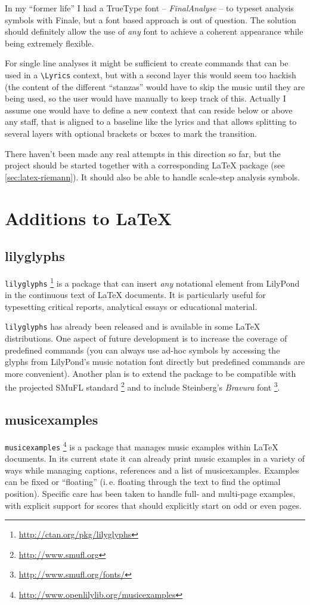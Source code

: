 \documentclass[oneside]{OLLbook}
\begin{document}
In my “former life” I had a TrueType font -- \emph{{FinalAnalyse}} -- to typeset analysis symbols with Finale, but a font based approach is out of question.
The solution should definitely allow the use of \emph{any} font to achieve a coherent appearance while being extremely flexible.

For single line analyses it might be sufficient to create commands that can be used in a \texttt{\textbackslash Lyrics} context, but with a second layer this would seem too hackish (the content of the different “stanzas” would have to skip the music until they are being used, so the user would have manually to keep track of this.
Actually I assume one would have to define a new context that can reside below or above any staff, that is aligned to a baseline like the lyrics and that allows splitting to several layers with optional brackets or boxes to mark the transition.

There haven't been made any real attempts in this direction so far, but the project should be started together with a corresponding \LaTeX{} package (see \ref{sec:latex-riemann}).
It should also be able to handle scale-step analysis symbols.

\chapter{Additions to \LaTeX}

\section{lilyglyphs}
\texttt{lilyglyphs}%
\footnote{\url{http://ctan.org/pkg/lilyglyphs}}
is a package that can insert \emph{any} notational element from LilyPond in the continuous text of \LaTeX{} documents.
It is particularly useful for typesetting critical reports, analytical essays or educational material.

\texttt{lilyglyphs} has already been released and is available in some \LaTeX{} distributions.
One aspect of future development is to increase the coverage of predefined commands (you can always use ad-hoc symbols by accessing the glyphs from LilyPond's music notation font directly but predefined commands are more convenient).
Another plan is to extend the package to be compatible with the projected SMuFL standard%
\footnote{\url{http://www.smufl.org}}
and to include Steinberg's \emph{Bravura} font%
\footnote{\url{http://www.smufl.org/fonts/}}.


\section{musicexamples}\label{sec:musicexamples}
\texttt{musicexamples}%
\footnote{\url{http://www.openlilylib.org/musicexamples}}
is a package that manages music examples within \LaTeX{} documents.
In its current state it can already print music examples in a variety of ways while managing captions, references and a list of musicexamples.
Examples can be fixed or “floating” (i.\,e. floating through the text to find the optimal position).
Specific care has been taken to handle full- and multi-page examples, with explicit support for scores that should explicitly start on odd or even pages.
\end{document}
